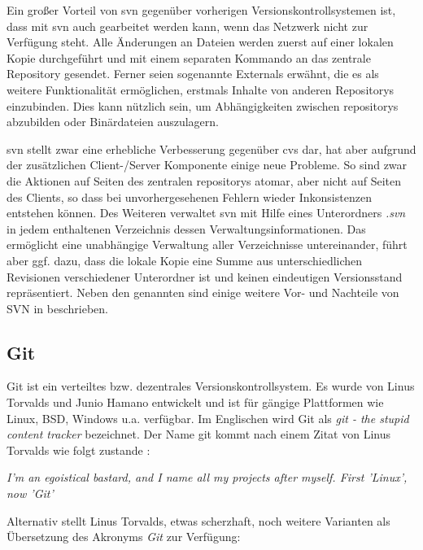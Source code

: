 Ein großer Vorteil von \acrshort{svn} gegenüber vorherigen
Versionskontrollsystemen ist, dass mit \acrshort{svn} auch gearbeitet werden
kann, wenn das Netzwerk nicht zur Verfügung steht. Alle Änderungen an Dateien
werden zuerst auf einer lokalen Kopie durchgeführt und mit einem separaten
Kommando an das zentrale Repository gesendet. Ferner seien sogenannte Externals
erwähnt, die es als weitere Funktionalität ermöglichen, erstmals Inhalte von
anderen Repositorys einzubinden. Dies kann nützlich sein, um Abhängigkeiten
zwischen \glspl{repository} abzubilden oder Binärdateien auszulagern. \cite[S.~384]{cd}

\acrshort{svn} stellt zwar eine erhebliche Verbesserung gegenüber
\acrshort{cvs} dar, hat aber aufgrund der zusätzlichen Client-/Server
Komponente einige neue Probleme. So sind zwar die Aktionen auf Seiten des
zentralen \glspl{repository} atomar, aber nicht auf Seiten des Clients, so dass
bei unvorhergesehenen Fehlern wieder Inkonsistenzen entstehen können. Des
Weiteren verwaltet \acrshort{svn} mit Hilfe eines Unterordners \textit{.svn} in
jedem enthaltenen Verzeichnis dessen Verwaltungsinformationen. Das ermöglicht
eine unabhängige Verwaltung aller Verzeichnisse untereinander, führt aber ggf.
dazu, dass die lokale Kopie eine Summe aus unterschiedlichen Revisionen
verschiedener Unterordner ist und keinen eindeutigen Versionsstand
repräsentiert. Neben den genannten sind einige weitere Vor- und Nachteile von
SVN in \cite[S.~382-385]{cd} beschrieben.

\subsection{Git}\label{git}
Git ist ein verteiltes bzw. dezentrales Versionskontrollsystem. Es wurde von Linus
Torvalds und Junio Hamano entwickelt und ist für gängige Plattformen wie Linux,
BSD, Windows u.a. verfügbar. Im Englischen wird Git als \textit{git - the
stupid content tracker} bezeichnet. Der Name \acrshort{git} kommt nach einem
Zitat von Linus Torvalds wie folgt zustande \cite{link:gitfaq}:

\begin{center}
\textit{\glqq{}I'm an egoistical bastard, and I name all my projects after
myself. First 'Linux', now 'Git'\grqq{}}\\
\end{center}

Alternativ stellt Linus Torvalds, etwas scherzhaft, noch weitere Varianten als
Übersetzung des Akronyms \textit{Git} zur Verf\-ügung\cite{link:gitfaq}:

